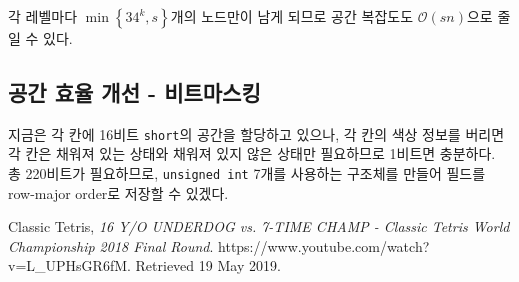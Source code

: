 각 레벨마다 $\min \left\{34^k, s\right\}$개의 노드만이 남게 되므로 공간 복잡도도
$\mathcal{O}\left(sn\right)$으로 줄일 수 있다.

\subsection{공간 효율 개선 - 비트마스킹}
지금은 각 칸에 16비트 \texttt{short}의 공간을 할당하고 있으나, 각 칸의 색상 정보를 버리면 각 칸은 채워져 있는 상태와 채워져 있지 않은 상태만 필요하므로
1비트면 충분하다. 총 220비트가 필요하므로, \texttt{unsigned int} 7개를 사용하는 구조체를 만들어 필드를 row-major order로 저장할 수 있겠다.

\begin{thebibliography}{1}
     Classic Tetris, \textit{16 Y/O UNDERDOG vs. 7-TIME CHAMP - Classic Tetris World Championship 2018 Final Round}.
    https://www.youtube.com/watch?v=L_UPHsGR6fM. Retrieved 19 May 2019.
\end{thebibliography}


